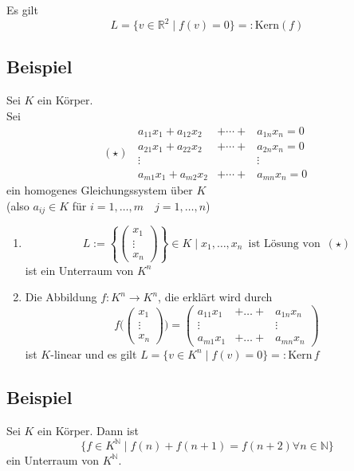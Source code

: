 Es gilt
\[
L = \{ v \in \mathds{R}^2 \mid f(v) = 0\} =: \text{Kern}(f)
\]

\subsection{Beispiel}
Sei $K$ ein Körper. \\
Sei 
\[ (\star)\enspace
\begin{matrix}
a_{11}x_1 + a_{12}x_2  & + \cdots + & a_{1n}x_n  = 0\\
a_{21}x_1 + a_{22}x_2 & + \cdots +  & a_{2n}x_n  = 0\\
\vdots & & \vdots \\
a_{m1}x_1 + a_{m2}x_2 & + \cdots +  & a_{mn}x_n = 0
\end{matrix}
\]
ein homogenes Gleichungssystem über $K$ \\
(also $a_{ij} \in K$ für $i=1, \ldots, m \quad j=1, \ldots, n$)

\begin{enumerate}[(1)]
	\item 
	\[
		L := \left\{ \begin{pmatrix}
			x_1 \\ \vdots \\ x_n
		\end{pmatrix} \right\}
		\in K \mid x_1, \ldots , x_n \enspace \text{ist Lösung von} \enspace ( \star)
	\]
	ist ein Unterraum von $K^n$
	\item Die Abbildung $f: K^n \to K^n$, die erklärt wird durch
	\[
		f \Bigg(\begin{pmatrix}
			x_1 \\ \vdots \\ x_n
		\end{pmatrix}\Bigg)
		= \begin{pmatrix}
			a_{11}x_1 & + \ldots + & a_{1n}x_n \\
			\vdots & & \vdots \\
			a_{m1}x_1 & + \ldots  + & a_{mn}x_n
		\end{pmatrix}
	\]
	ist $K$-linear und es gilt $L= \{v \in K^n \mid f(v) =0 \} =: \text{Kern} \, f$
\end{enumerate}


\subsection{Beispiel} %
\label{sub:beispiel}
Sei $K$ ein Körper. Dann ist 
\[
	\Big\{ f \in K^{\mathds{N}} \mid f(n) + f(n+1) = f(n+2) \forall n \in \mathds{N} \Big\}
\]
ein Unterraum von $K^{\mathds{N}}$.

